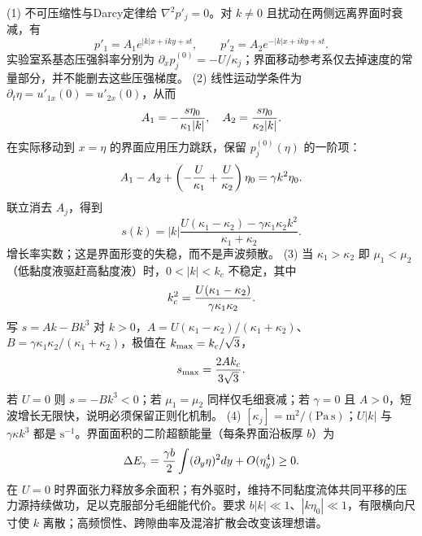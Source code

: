 (1) 不可压缩性与Darcy定律给 \(\nabla^2p'_j=0\)。对 \(k\ne0\) 且扰动在两侧远离界面时衰减，有
\[
p'_1=A_1e^{|k|x+iky+st},\qquad p'_2=A_2e^{-|k|x+iky+st}.
\]
实验室系基态压强斜率分别为 \(\partial_xp_j^{(0)}=-U/\kappa_j\)；界面移动参考系仅去掉速度的常量部分，并不能删去这些压强梯度。
(2) 线性运动学条件为 \(\partial_t\eta=u'_{1x}(0)=u'_{2x}(0)\)，从而
\[
A_1=-{s\eta_0\over\kappa_1|k|},\quad A_2={s\eta_0\over\kappa_2|k|}.
\]
在实际移动到 \(x=\eta\) 的界面应用压力跳跃，保留 \(p_j^{(0)}(\eta)\) 的一阶项：
\[
A_1-A_2+\left(-{U\over\kappa_1}+{U\over\kappa_2}\right)\eta_0
=\gamma k^2\eta_0 .
\]
联立消去 \(A_j\)，得到
\[
\boxed{s(k)=|k|\frac{U(\kappa_1-\kappa_2)-\gamma\kappa_1\kappa_2k^2}{\kappa_1+\kappa_2}}.
\]
增长率实数；这是界面形变的失稳，而不是声波频散。
(3) 当 \(\kappa_1>\kappa_2\) 即 \(\mu_1<\mu_2\)（低黏度液驱赶高黏度液）时，\(0<|k|<k_c\) 不稳定，其中
\[
k_c^2={U(\kappa_1-\kappa_2)\over\gamma\kappa_1\kappa_2}.
\]
写 \(s=A k-Bk^3\) 对 \(k>0\)，\(A=U(\kappa_1-\kappa_2)/(\kappa_1+\kappa_2)\)、\(B=\gamma\kappa_1\kappa_2/(\kappa_1+\kappa_2)\)，极值在 \(k_{\rm max}=k_c/\sqrt3\)，
\[
s_{\rm max}={2A k_c\over3\sqrt3}.
\]
若 \(U=0\) 则 \(s=-Bk^3<0\)；若 \(\mu_1=\mu_2\) 同样仅毛细衰减；若 \(\gamma=0\) 且 \(A>0\)，短波增长无限快，说明必须保留正则化机制。
(4) \([\kappa_j]=\mathrm{m^2/(Pa\,s)}\)；\(U|k|\) 与 \(\gamma\kappa k^3\) 都是 \(\mathrm{s^{-1}}\)。界面面积的二阶超额能量（每条界面沿板厚 \(b\)）为
\[
\Delta E_\gamma={\gamma b\over2}\int(\partial_y\eta)^2dy+O(\eta_y^4)\ge0.
\]
在 \(U=0\) 时界面张力释放多余面积；有外驱时，维持不同黏度流体共同平移的压力源持续做功，足以克服部分毛细能代价。要求 \(b|k|\ll1\)、\(|k\eta_0|\ll1\)，有限横向尺寸使 \(k\) 离散；高频惯性、跨隙曲率及混溶扩散会改变该理想谱。
